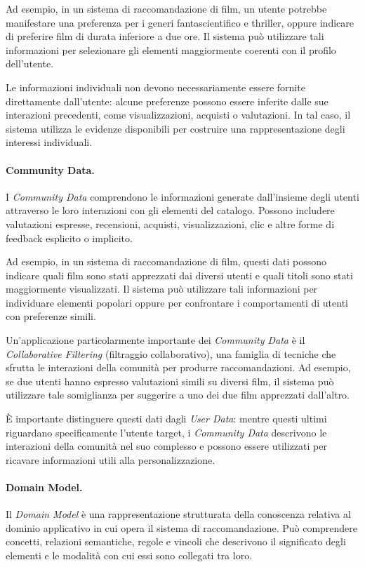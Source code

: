 Ad esempio, in un sistema di raccomandazione di film, un utente
potrebbe manifestare una preferenza per i generi fantascientifico
e thriller, oppure indicare di preferire film di durata inferiore
a due ore. Il sistema può utilizzare tali informazioni per
selezionare gli elementi maggiormente coerenti con il profilo
dell'utente.

Le informazioni individuali non devono necessariamente essere
fornite direttamente dall'utente: alcune preferenze possono essere
inferite dalle sue interazioni precedenti, come visualizzazioni,
acquisti o valutazioni. In tal caso, il sistema utilizza le evidenze
disponibili per costruire una rappresentazione degli interessi
individuali.

\paragraph{Community Data.}
I \textit{Community Data} comprendono le informazioni generate
dall'insieme degli utenti attraverso le loro interazioni con gli
elementi del catalogo. Possono includere valutazioni espresse,
recensioni, acquisti, visualizzazioni, clic e altre forme di
feedback esplicito o implicito.

Ad esempio, in un sistema di raccomandazione di film, questi dati
possono indicare quali film sono stati apprezzati dai diversi utenti
e quali titoli sono stati maggiormente visualizzati. Il sistema può
utilizzare tali informazioni per individuare elementi popolari
oppure per confrontare i comportamenti di utenti con preferenze
simili.

Un'applicazione particolarmente importante dei \textit{Community Data}
è il \textit{Collaborative Filtering} (filtraggio collaborativo),
una famiglia di tecniche che sfrutta le interazioni della comunità
per produrre raccomandazioni. Ad esempio, se due utenti hanno
espresso valutazioni simili su diversi film, il sistema può
utilizzare tale somiglianza per suggerire a uno dei due film
apprezzati dall'altro.

È importante distinguere questi dati dagli \textit{User Data}:
mentre questi ultimi riguardano specificamente l'utente target,
i \textit{Community Data} descrivono le interazioni della comunità
nel suo complesso e possono essere utilizzati per ricavare
informazioni utili alla personalizzazione.

\paragraph{Domain Model.}
Il \textit{Domain Model} è una rappresentazione strutturata della
conoscenza relativa al dominio applicativo in cui opera il sistema
di raccomandazione. Può comprendere concetti, relazioni semantiche,
regole e vincoli che descrivono il significato degli elementi e
le modalità con cui essi sono collegati tra loro.

